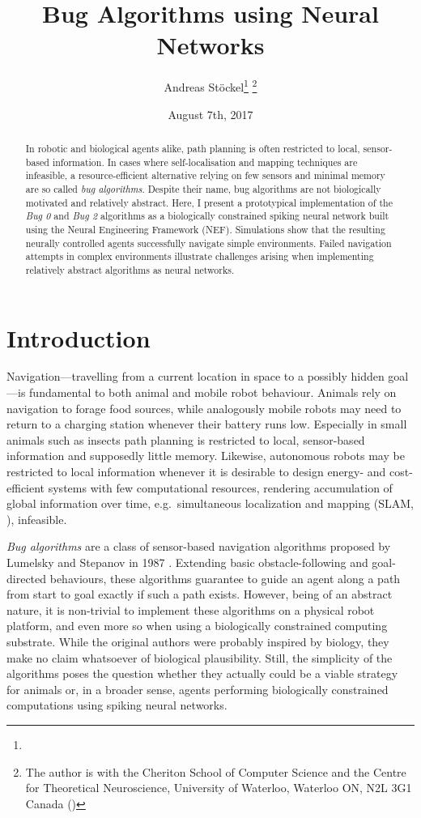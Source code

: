 \documentclass[letterpaper,10pt,conference]{ieeeconf}
\title{Bug Algorithms using Neural Networks}
\date{August 7th, 2017}
\author{Andreas Stöckel\thanks{}
  \thanks{The author is with the Cheriton School of Computer Science and the Centre for Theoretical Neuroscience, University of Waterloo, Waterloo ON, N2L 3G1
    Canada  (\you)}}
\begin{document}
\maketitle

\begin{abstract}
In robotic and biological agents alike, path planning is often restricted to local, sensor-based information. In cases where self-localisation and mapping techniques are infeasible, a resource-efficient alternative relying on few sensors and minimal memory are so called \emph{bug algorithms}. Despite their name, bug algorithms are not biologically motivated and relatively abstract. Here, I present a prototypical implementation of the \emph{Bug 0} and \emph{Bug 2} algorithms as a biologically constrained spiking neural network built using the Neural Engineering Framework (NEF). Simulations show that the resulting neurally controlled agents successfully navigate simple environments. Failed navigation attempts in complex environments illustrate challenges arising when implementing relatively abstract algorithms as neural networks.
\end{abstract}

\section{Introduction}

Navigation---travelling from a current location in space to a possibly hidden goal---is fundamental to both animal and mobile robot behaviour. Animals rely on navigation to forage food sources, while analogously mobile robots may need to return to a charging station whenever their battery runs low. Especially in small animals such as insects path planning is restricted to local, sensor-based information and supposedly little memory. Likewise, autonomous robots may be restricted to local information whenever it is desirable to design energy- and cost-efficient systems with few computational resources, rendering accumulation of global information over time, e.g.~simultaneous localization and mapping (SLAM, \cite{thrun2002probabilistic}), infeasible.

\emph{Bug algorithms} are a class of sensor-based navigation algorithms proposed by Lumelsky and Stepanov in 1987 \cite{lumelsky1987path}. Extending basic obstacle-following and goal-directed behaviours, these algorithms guarantee to guide an agent along a path from start to goal exactly if such a path exists. However, being of an abstract nature, it is non-trivial to implement these algorithms on a physical robot platform, and even more so when using a biologically constrained computing substrate. While the original authors were probably inspired by biology, they make no claim whatsoever of biological plausibility. Still, the simplicity of the algorithms poses the question whether they actually could be a viable strategy for animals or, in a broader sense, agents performing biologically constrained computations using spiking neural networks.
\end{document}
